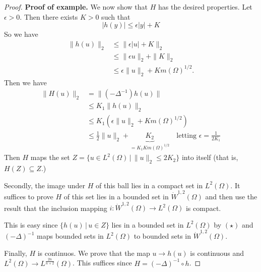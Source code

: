 \documentclass[10pt, oneside, reqno]{amsart}
\theoremstyle{plain}%
\numberwithin{equation}{section}
\theoremstyle{definition}
\theoremstyle{remark}
\newcommand{\given}{ \, | \,}
\begin{document}
\begin{proof}
    \textbf{Proof of example.}  We now show that $H$ has the desired properties.  Let $\epsilon > 0$.  Then there exists $K > 0$ such that \[
        |h(y) | \leq \epsilon |y| + K
    \]  So we have \begin{align*}
        \| h(u) \|_2    &\leq \| \epsilon|u| + K \|_2 \\
                        &\leq \| \epsilon u \|_2 + \| K \|_2 \\
                        &\leq \epsilon \| u \|_2 + K m(\Omega)^{1/2}. \tag{$\star$}
    \end{align*} Then we have \begin{align*}
        \| H(u) \|_2    &= \| (-\Delta^{-1}) h(u) \| \\
                        &\leq K_1 \| h(u) \|_2 \\
                        &\leq K_1 \left( \epsilon \| u \|_2 + K m(\Omega)^{1/2} \right) \\
                        &\leq \frac{1}{2} \| u \|_2 + \underbrace{K_2}_{= K_1 K m(\Omega)^{1/2}} \quad \text{letting $\epsilon = \frac{1}{2K_1}$}
    \end{align*}  Then $H$ maps the set $ Z = \{ u \in L^2(\Omega) \given \| u \|_2 \leq 2 K_2 \}$ into itself (that is, $H(Z) \subseteq Z$.)
    
    Secondly, the image under $H$ of this ball lies in a compact set in $L^2(\Omega)$.  It suffices to prove $H$ of this set lies in a bounded set in $\dot W^{1,2}(\Omega)$ and then use the result that the inclusion mapping $i : \dot W^{1, 2}(\Omega) \rightarrow L^2(\Omega)$ is compact.
    
    This is easy since $\{ h(u) \given u \in Z \}$ lies in a bounded set in $L^2(\Omega)$ by $(\star)$ and $(-\Delta)^{-1}$ maps bounded sets in $L^2(\Omega)$ to bounded sets in $\dot W^{1, 2}(\Omega)$.  
    
    Finally, $H$ is continuos. We prove that the map $u \rightarrow h(u)$ is continuous and $L^2(\Omega) \rightarrow L^{\frac{2n}{n+2}}(\Omega)$.  This suffices since $H = (-\Delta)^{-1} \circ h$.  
    

\end{proof}
\end{document}

